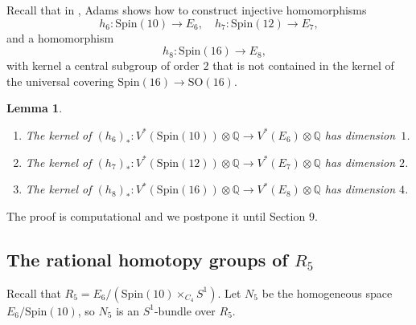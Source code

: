 \documentclass[twoside,a4paper,reqno,11pt]{amsart}
\newtheorem{lemma}{Lemma}[subsection]
\newcommand{\Q}{\mathbb{Q}}
\newcommand{\Spin}{\mathrm{Spin}}
\newcommand{\SO}{\mathrm{SO}}
\begin{document}
Recall that in \cite[Theorem~6.1]{MR1428422}, Adams shows how to construct injective homomorphisms 
\[
h_6 : \Spin(10) \to E_6, \quad h_7 : \Spin(12) \to E_7,
\] 
and a homomorphism
\[
\quad h_8 : \Spin(16) \to E_8,
\]
with kernel a central subgroup of order $2$ that is not contained in the kernel of the universal covering $\Spin(16) \to \SO(16)$.  


\begin{lemma} \label{lem:kernelsofhmaps}
\begin{enumerate}
\item The kernel of $(h_6)_* : V^*(\Spin(10)) \otimes \Q \to V^*(E_6) \otimes \Q$ has dimension~$1$.
\item The kernel of $(h_7)_* : V^*(\Spin(12)) \otimes \Q \to V^*(E_7) \otimes \Q$ has dimension $2$.
\item The kernel of $(h_8)_* : V^*(\Spin(16)) \otimes \Q  \to V^*(E_8) \otimes \Q$ has dimension $4$.
\end{enumerate}
\end{lemma}
The proof is computational and we postpone it until Section 9.

\subsection{The rational homotopy groups of $R_5$}
Recall that $R_5 = E_6/(\Spin(10)\times_{C_4}S^1)$.  Let $N_5$ be the homogeneous space $E_6/\Spin(10)$, so $N_5$ is an $S^1$-bundle over $R_5$.  
\end{document}
